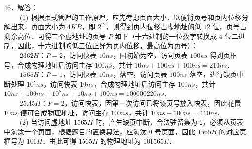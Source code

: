 46．解答： \\
$\qquad$ (1) 根据页式管理的工作原理，应先考虑页面大小，以便将页号和页内位移分解出来．页面大小为 $4KB$，即 $2^{12}$，则得到页内位移占虚地址的低 $12$ 位，页号占剩余高位．可得三个虚地址的页号 $P$ 如下（十六进制的一位数字转换成 $4$ 位二进制，因此，十六进制的低三位正好为页内位移，最高位为页号）： \\
$\qquad$ $2362H$：$P=2$，访问快表 $10ns$，因初始为空，访问页表 $100ns$ 得到页框号，合成物理地址后访问主存 $100ns$，共计 $10ns+100ns+100ns=210ns$． \\
$\qquad$ $1565H$：$P=1$，访问快表 $10ns$，落空，访问页表 $100ns$ 落空，进行缺页中断处理 $10^8ns$，访问快表 $10ns$，合成物理地址后访问主存 $100ns$，共计 $10ns+100ns+10^8ns+10ns+100ns=100 000 220ns$． \\
$\qquad$ $25A5H$：$P=2$，访问快表，因第一次访问已将该页号放入快表，因此花费 $10ns$ 便可合成物理地址，访问主存 $100ns$，共计 $10ns+100ns=110ns$． \\
$\qquad$ (2) 当访问虚地址 $1565H$ 时，产生缺页中断，合法驻留集为 $2$，必须从页表中淘汰一个页面，根据题目的置换算法，应淘汰 $0$ 号页面，因此 $1565H$ 的对应页框号为 $101H$．由此可得 $1565H$ 的物理地址为 $101565H$．

